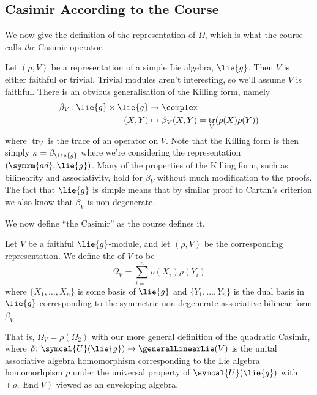 \documentclass[fleqn]{NotesClass}
\DeclareMathOperator{\End}{End}
\DeclareMathOperator{\tr}{tr}
\newcommand{\ad}{\symrm{ad}}
\newcommand{\universalenveloping}{\symcal{U}}
\begin{document}
    \subsection{Casimir According to the Course}
    We now give the definition of the representation of \(\Omega\), which is what the course calls \emph{the} Casimir operator.
    
    Let \((\rho, V)\) be a representation of a simple Lie algebra, \(\lie{g}\).
    Then \(V\) is either faithful or trivial.
    Trivial modules aren't interesting, so we'll assume \(V\) is faithful.
    There is an obvious generalisation of the Killing form, namely
    \begin{align}
        \beta_V \colon \lie{g} \times \lie{g} &\to \complex\\
        (X, Y) &\mapsto \beta_V(X, Y) = \tr_V(\rho(X)\rho(Y))
    \end{align}
    where \(\tr_V\) is the trace of an operator on \(V\).
    Note that the Killing form is then simply \(\kappa = \beta_{\lie{g}}\) where we're considering the representation \((\ad, \lie{g})\).
    Many of the properties of the Killing form, such as bilinearity and associativity, hold for \(\beta_V\) without much modification to the proofs.
    The fact that \(\lie{g}\) is simple means that by similar proof to Cartan's criterion we also know that \(\beta_V\) is non-degenerate.
    
    We now define \enquote{the Casimir} as the course defines it.
    
    \begin{dfn}{}{}
        Let \(V\) be a faithful \(\lie{g}\)-module, and let \((\rho, V)\) be the corresponding representation.
        We define the  of \(V\) to be
        \begin{equation}
            \Omega_V = \sum_{i=1}^n \rho(X_i)\rho(Y_i)
        \end{equation}
        where \(\{X_1, \dotsc, X_n\}\) is some basis of \(\lie{g}\) and \(\{Y_1, \dotsc, Y_n\}\) is the dual basis in \(\lie{g}\) corresponding to the symmetric non-degenerate associative bilinear form \(\beta_V\).
    \end{dfn}
     
    That is, \(\Omega_V = \tilde{\rho}(\Omega_2)\) with our more general definition of the quadratic Casimir, where \(\tilde{\rho} \colon \universalenveloping(\lie{g}) \to \generalLinearLie(V)\) is the unital associative algebra homomorphism corresponding to the Lie algebra homomorhpism \(\rho\) under the universal property of \(\universalenveloping(\lie{g})\) with \((\rho, \End V)\) viewed as an enveloping algebra.
    
\end{document}

